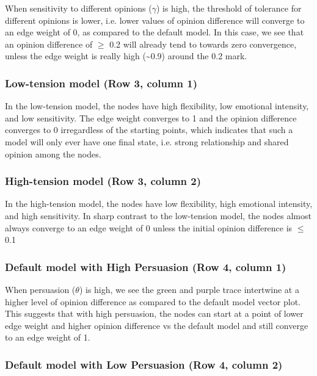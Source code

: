 \documentclass[11pt]{article}
\begin{document}
When sensitivity to different opinions (\(\gamma\)) is high, the
threshold of tolerance for different opinions is lower, i.e. lower
values of opinion difference will converge to an edge weight of 0, as
compared to the default model. In this case, we see that an opinion
difference of \(\geq\) 0.2 will already tend to towards zero
convergence, unless the edge weight is really high
(\textasciitilde{}0.9) around the 0.2 mark.

 \subsubsection*{Low-tension model (Row 3, column 1)}

In the low-tension model, the nodes have high flexibility, low emotional
intensity, and low sensitivity. The edge weight converges to 1 and the
opinion difference converges to 0 irregardless of the starting points,
which indicates that such a model will only ever have one final state,
i.e. strong relationship and shared opinion among the nodes.

 \subsubsection*{High-tension model (Row 3, column 2)}

In the high-tension model, the nodes have low flexibility, high
emotional intensity, and high sensitivity. In sharp contrast to the
low-tension model, the nodes almost always converge to an edge weight of
0 unless the initial opinion difference is \(\leq\) 0.1

 \subsubsection*{Default model with High Persuasion (Row 4, column 1)}

When persuasion (\(\theta\)) is high, we see the green and purple trace
intertwine at a higher level of opinion difference as compared to the
default model vector plot. This suggests that with high persuasion, the
nodes can start at a point of lower edge weight and higher opinion
difference vs the default model and still converge to an edge weight of
1.

 \subsubsection*{Default model with Low Persuasion (Row 4, column 2)}
\end{document}

